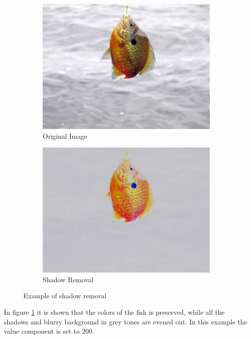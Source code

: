 \begin{figure}[h]
    \centering
    \begin{subfigure}{0.5\textwidth}
        \centering
        \includegraphics[width=.9\linewidth]{images/literature/colorfish}
        \caption{Original Image\cite{website:colorfish_image}}
    \end{subfigure}%
    \begin{subfigure}{.5\textwidth}
        \centering
        \includegraphics[width=.9\linewidth]{images/literature/shadow_removal}
        \caption{Shadow Removal}
    \end{subfigure}
    \caption{Example of shadow removal}
    \label{fig:shadow_removal}
\end{figure}

In figure \ref{fig:shadow_removal} it is shown that the colors of the fish is preserved, while all the shadows and blurry background in grey tones are evened out. In this example the value component is set to 200.

